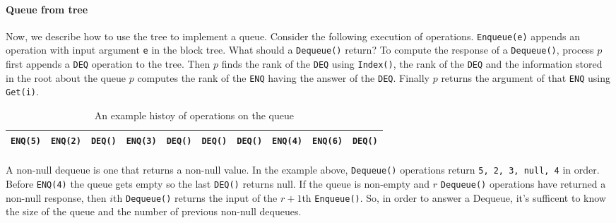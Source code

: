 \documentclass[10pt]{article}
\theoremstyle{definition}
\begin{document}
\paragraph{Queue from tree}
Now, we describe how to use the tree to implement a queue. Consider the following execution of operations. \texttt{Enqueue(e)} appends an operation with input argument \texttt{e} in the block tree. What should a \texttt{Dequeue()} return? To compute the response of a \texttt{Dequeue()}, process $p$ first appends a \texttt{DEQ} operation to the tree. Then $p$ finds the rank of the \texttt{DEQ} using \texttt{Index()}, the rank of the \texttt{DEQ} and the information stored in the root about the queue $p$ computes the rank of  the \texttt{ENQ} having the answer of the \texttt{DEQ}. Finally $p$ returns the argument of that \texttt{ENQ} using \texttt{Get(i)}.

\begin{table}[hbt]
\centering
  \begin{tabular}{c|c|c|c|c|c|c|c|c|c}
    \hline \texttt{ENQ(5)}& \texttt{ENQ(2)}& \texttt{DEQ()}& \texttt{ENQ(3)}&\texttt{DEQ()}& \texttt{DEQ()}& \texttt{DEQ()}& \texttt{ENQ(4)}& \texttt{ENQ(6)}& \texttt{DEQ()}\\ \hline
  \end{tabular}
  \caption{An example histoy of operations on the queue}
\end{table}



\paragraph{}
A non-null dequeue is one that returns a non-null value. In the example above, \texttt{Dequeue()} operations return \texttt{5, 2, 3, null, 4} in order. Before \texttt{ENQ(4)} the queue gets empty so the last \texttt{DEQ()} returns null. If the queue is non-empty and $r$ \texttt{Dequeue()} operations have returned a non-null response, then $i$th \texttt{Dequeue()} returns the input of the $r+1$th \texttt{Enqueue()}. So, in order to answer a Dequeue, it's sufficent to know the size of the queue and the number of previous non-null dequeues.

\end{document}
